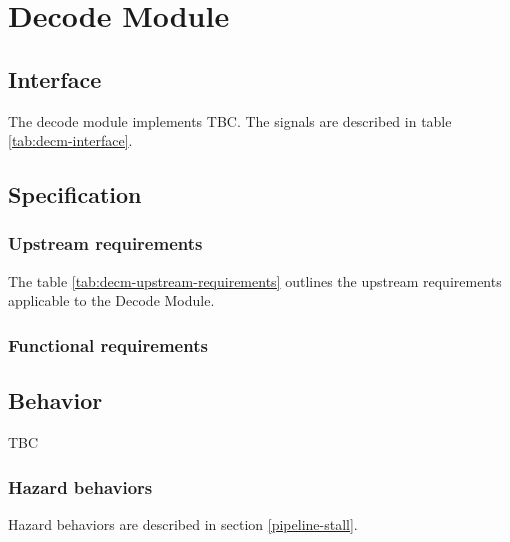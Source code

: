 \section{Decode Module}

  \subsection{Interface}

    \begin{content}
        The decode module implements TBC. The signals are described in table \ref{tab:decm-interface}. 
      \end{content}

    

  \subsection{Specification}

    \subsubsection{Upstream requirements}

      The table \ref{tab:decm-upstream-requirements} outlines the upstream requirements applicable to the Decode Module.

      

    \subsubsection{Functional requirements}

  \subsection{Behavior}

    \begin{content}
        TBC
      \end{content}

    \subsubsection{Hazard behaviors}

      \begin{content}
          Hazard behaviors are described in section \ref{pipeline-stall}.
        \end{content}

\newpage
